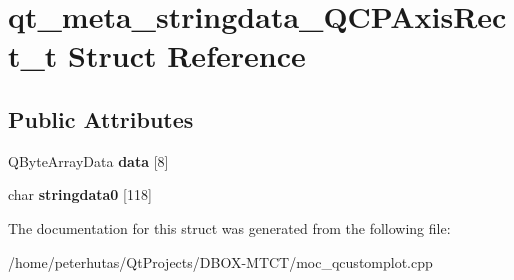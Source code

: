 \hypertarget{structqt__meta__stringdata___q_c_p_axis_rect__t}{}\section{qt\+\_\+meta\+\_\+stringdata\+\_\+\+Q\+C\+P\+Axis\+Rect\+\_\+t Struct Reference}
\label{structqt__meta__stringdata___q_c_p_axis_rect__t}
\subsection*{Public Attributes}
\begin{DoxyCompactItemize}
\item 
\mbox{\label{structqt__meta__stringdata___q_c_p_axis_rect__t_abe371091541ce1b738a7026d4387d5b2}} 
Q\+Byte\+Array\+Data {\bfseries data} \mbox{[}8\mbox{]}
\item 
\mbox{\label{structqt__meta__stringdata___q_c_p_axis_rect__t_a7263fed0445758459e2610e1b9fffe05}} 
char {\bfseries stringdata0} \mbox{[}118\mbox{]}
\end{DoxyCompactItemize}


The documentation for this struct was generated from the following file\+:\begin{DoxyCompactItemize}
\item 
/home/peterhutas/\+Qt\+Projects/\+D\+B\+O\+X-\/\+M\+T\+C\+T/moc\+\_\+qcustomplot.\+cpp\end{DoxyCompactItemize}

